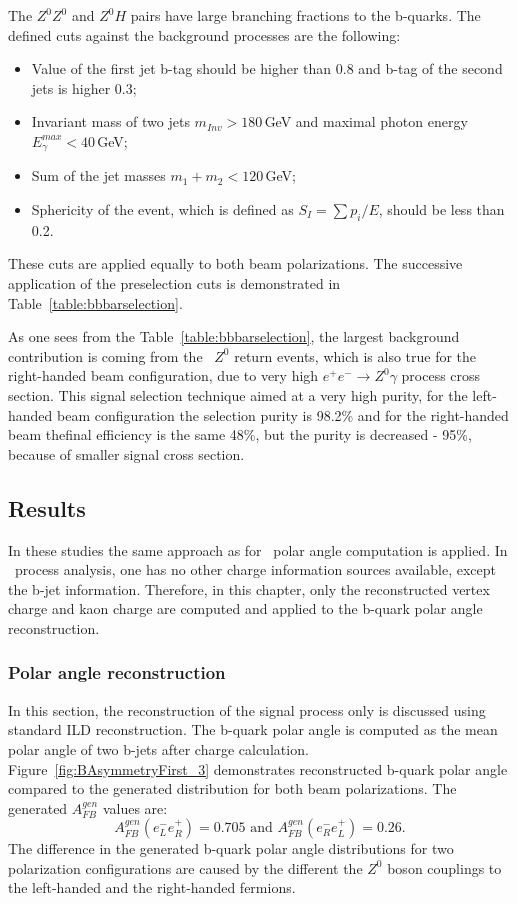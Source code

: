 The $Z^0Z^0$ and $Z^0H$ pairs have large branching fractions to the b-quarks. 
The defined cuts against the background processes are the following:
\begin{itemize}
	\item Value of the first jet b-tag should be higher than 0.8 and b-tag of the second jets is higher 0.3;
	\item Invariant mass of two jets $m_{Inv} > 180$\,GeV and maximal photon energy $E^{max}_\gamma < 40$\,GeV;
	\item Sum of the jet masses $m_1+m_2<120$\,GeV;
	\item Sphericity of the event, which is defined as $S_{I} = \sum p_i / E$, should be less than 0.2.
\end{itemize}
These cuts are applied equally to both beam polarizations.
The successive application of the preselection cuts is demonstrated in Table~\ref{table:bbbarselection}.


As one sees from the Table~\ref{table:bbbarselection}, the largest background contribution is coming from the \bbbar\ $Z^0$ return events, which is also true for the right-handed beam configuration, due to very high $e^+e^-\to Z^0\gamma$ process cross section.
This signal selection technique  aimed at a very high purity, for the left-handed beam configuration the selection purity is 98.2\% and for the right-handed beam thefinal efficiency is the same 48\%, but the purity is decreased - 95\%, because of smaller signal cross section.




\subsection{Results}
\label{sec:BBBarresults}
In these studies the same approach as for \ttbar\ polar angle computation is applied. In \bbbar\ process analysis, one has no other charge information sources available, except the b-jet information. 
Therefore, in this chapter, only the reconstructed vertex charge and kaon charge are computed and applied to the b-quark polar angle reconstruction. 

\subsubsection{Polar angle reconstruction}
In this section, the reconstruction of the signal process only is discussed using standard ILD reconstruction. %
The b-quark polar angle is computed as the mean polar angle of two b-jets after charge calculation. 
Figure~\ref{fig:BAsymmetryFirst_3} demonstrates reconstructed b-quark polar angle compared to the generated distribution for both beam polarizations. 
The generated $A_{FB}^{gen}$ values are:
\begin{equation}
	A_{FB}^{gen}(e^-_L e^+_R) = 0.705\text{ and }A_{FB}^{gen}(e^-_R e^+_L) = 0.26.
\end{equation} 
The difference in the generated b-quark polar angle distributions for two polarization configurations are caused by the different the $Z^0$ boson couplings to the left-handed and the right-handed fermions. 

